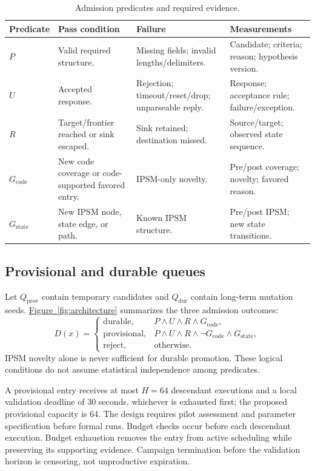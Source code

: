 \documentclass[final,5p,times,number]{elsarticle}
\newcommand{\gcode}{G_{\mathrm{code}}}
\newcommand{\gstate}{G_{\mathrm{state}}}
\newcommand{\namedref}[2]{\hyperref[#2]{#1~\ref*{#2}}}
\begin{document}
\begin{table}[!tbp]
\centering\small
\caption{Admission predicates and required evidence.}
\label{tab:predicates}
\begin{tabularx}{\textwidth}{l Y Y Y}
\toprule
Predicate & Pass condition & Failure & Measurements \\
\midrule
$P$ & Valid required structure. & Missing fields; invalid lengths/delimiters. & Candidate; criteria; reason; hypothesis version. \\
$U$ & Accepted response. & Rejection; timeout/reset/drop; unparseable reply. & Response; acceptance rule; failure/exception. \\
$R$ & Target/frontier reached or sink escaped. & Sink retained; destination missed. & Source/target; observed state sequence. \\
$\gcode$ & New code coverage or code-supported favored entry. & IPSM-only novelty. & Pre/post coverage; novelty; favored reason. \\
$\gstate$ & New IPSM node, state edge, or path. & Known IPSM structure. & Pre/post IPSM; new state transitions. \\
\bottomrule
\end{tabularx}
\end{table}

\subsection{Provisional and durable queues}
Let $Q_{\mathrm{prov}}$ contain temporary candidates and $Q_{\mathrm{dur}}$ contain long-term mutation seeds. \namedref{Figure}{fig:architecture} summarizes the three admission outcomes:
\begin{equation}
D(x)=
\begin{cases}
\mathrm{durable}, & P\land U\land R\land\gcode,\\
\mathrm{provisional}, & P\land U\land R\land\neg\gcode\land\gstate,\\
\mathrm{reject}, & \text{otherwise}.
\end{cases}\label{eq:admission}
\end{equation}
IPSM novelty alone is never sufficient for durable promotion. These logical conditions do not assume statistical independence among predicates.

A provisional entry receives at most $H=64$ descendant executions and a local validation deadline of 30 seconds, whichever is exhausted first; the proposed provisional capacity is 64. The design requires pilot assessment and parameter specification before formal runs. Budget checks occur before each descendant execution. Budget exhaustion removes the entry from active scheduling while preserving its supporting evidence. Campaign termination before the validation horizon is censoring, not unproductive expiration.
\end{document}
